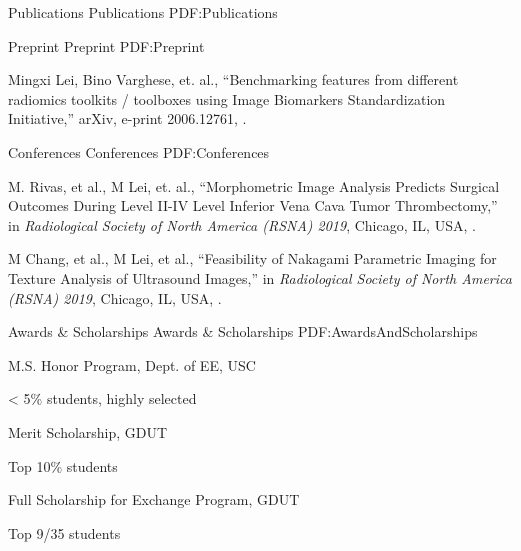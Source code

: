 \documentclass[letterpaper,MMMyyyy,nonstopmode]{simpleresumecv}
\begin{document}
\begin{Body}
\Section
{Publications}
{Publications}
{PDF:Publications}

\SubSection
{Preprint}
{Preprint}
{PDF:Preprint}

\begingroup
\renewcommand{\MaxNumberedItem}{[8888]}

\BigGap
\NumberedItem{[1]}
Mingxi Lei, Bino Varghese, et. al., 
``Benchmarking features from different radiomics toolkits / toolboxes using Image Biomarkers Standardization Initiative,''
arXiv, e-print 2006.12761, 
.

\endgroup

\SubSection
{Conferences}
{Conferences}
{PDF:Conferences}

\begingroup
\renewcommand{\MaxNumberedItem}{[8888]}

\BigGap
\NumberedItem{[1]}
M. Rivas, et al., M Lei, et. al.,
``Morphometric Image Analysis Predicts Surgical Outcomes During Level II-IV Level Inferior Vena Cava Tumor Thrombectomy,''
in \textit{Radiological Society of North America (RSNA) 2019},
Chicago, IL, USA,
.

\Gap
\NumberedItem{[2]}
{M Chang, et al., M Lei, et al.,
``Feasibility of Nakagami Parametric Imaging for Texture Analysis of Ultrasound Images,''
in \textit{Radiological Society of North America (RSNA) 2019},
Chicago, IL, USA,
.}

\endgroup


\Section
{Awards \&\newline
Scholarships}
{Awards \& Scholarships}
{PDF:AwardsAndScholarships}

\BulletItem
M.S. Honor Program, Dept. of EE, USC
\hfill
{}
\begin{Detail}
\Item
< 5\% students, highly selected
\end{Detail}

\Gap
\BulletItem
Merit Scholarship, GDUT
\hfill
{}
\begin{Detail}
\Item
Top 10\% students
\end{Detail}

\Gap
\BulletItem
Full Scholarship for Exchange Program, GDUT
\hfill
{}
\begin{Detail}
\Item
Top 9/35 students
\end{Detail}


\end{Body}
\end{document}
